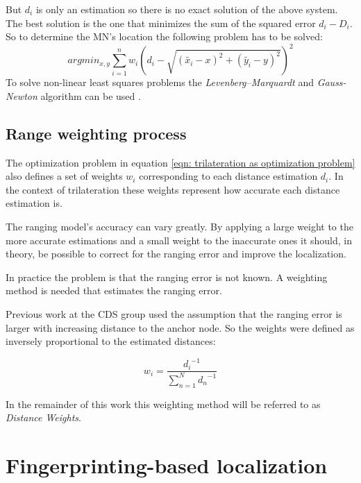 But \(d_{i}\) is only an estimation so there is no exact solution of the above system. The best solution is the one that minimizes the sum of the squared error \(d_{i} - D_{i}\). So to determine the MN's location the following problem has to be solved:
\begin{equation}
argmin_{x,y}\sum_{i=1}^{n}w_{i}\left ( d_{i} - \sqrt{\left ( \tilde{x_{i}}-x \right )^{2}+\left ( \tilde{y_{i}}-y \right )^{2}} \right )^{2}
\label{eqn: trilateration as optimization problem}
\end{equation}
To solve non-linear least squares problems the \emph{Levenberg–Marquardt} and \emph{Gauss-Newton} algorithm can be used \cite{GaussNewtonwikipedia,LevenbergMarquardtwikipedia}.

\subsection{Range weighting process}

The optimization problem in equation \ref{eqn: trilateration as optimization problem} also defines a set of weights $w_i$ corresponding to each distance estimation $d_i$. In the context of trilateration these weights represent how accurate each distance estimation is.

The ranging model's accuracy can vary greatly. By applying a large weight to the more accurate estimations and a small weight to the inaccurate ones it should, in theory, be possible to correct for the ranging error and improve the localization.

In practice the problem is that the ranging error is not known. A weighting method is needed that estimates the ranging error.

Previous work at the CDS group \cite{FineGrainedIndoorTracking} used the assumption that the ranging error is larger with increasing distance to the anchor node. So the weights were defined as inversely proportional to the estimated distances:

\begin{equation}
w_{i}=\frac{{d_i}^{-1}}{\sum_{n=1}^{N}{d_n}^{-1}}
\label{eqn: distance weights}
\end{equation}

In the remainder of this work this weighting method will be referred to as \emph{Distance Weights}.

\section{Fingerprinting-based localization}

